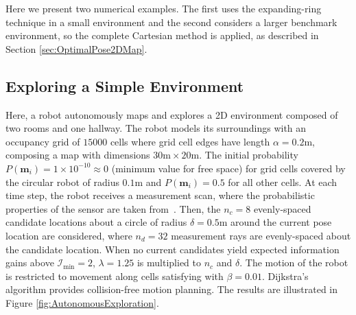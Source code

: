 Here we present two numerical examples. The first uses the expanding-ring technique in a small environment and the second considers a larger benchmark environment, so the complete Cartesian method is applied, as described in Section \ref{sec:OptimalPose2DMap}.

\subsection{Exploring a Simple Environment}

Here, a robot autonomously maps and explores a 2D environment composed of two rooms and one hallway. The robot models its surroundings with an occupancy grid of $15000$ cells where grid cell edges have length $\alpha=0.2$m, composing a map with dimensions $30\text{m}\times20\text{m}$. The initial probability $P(\mathbf{m}_i)=1\times10^{-10}\approx0$ (minimum value for free space) for grid cells covered by the circular robot of radius $0.1$m and $P(\mathbf{m}_i)=0.5$ for all other cells.
At each time step, the robot receives a measurement scan, where the probabilistic properties of the sensor are taken from~\cite{PirRutBisSch11,KhoElb12}. Then, the $n_c=8$ evenly-spaced candidate locations about a circle of radius $\delta=0.5$m around the current pose location are considered, where $n_d=32$ measurement rays are evenly-spaced about the candidate location.  When no current candidates yield expected information gains above $\mathcal I_\text{min}=2$, $\lambda=1.25$ is multiplied to $n_c$ and $\delta$. The motion of the robot is restricted to movement along cells satisfying  with $\beta=0.01$. Dijkstra's algorithm provides collision-free motion planning.
The results are illustrated in Figure \ref{fig:AutonomousExploration}.


